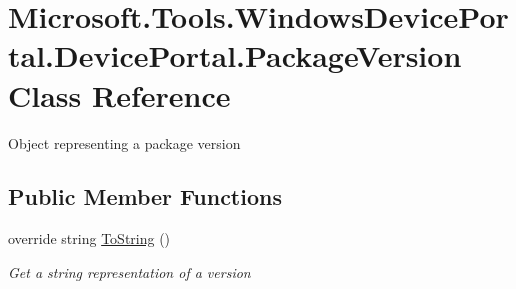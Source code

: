 \hypertarget{class_microsoft_1_1_tools_1_1_windows_device_portal_1_1_device_portal_1_1_package_version}{}\section{Microsoft.\+Tools.\+Windows\+Device\+Portal.\+Device\+Portal.\+Package\+Version Class Reference}
\label{class_microsoft_1_1_tools_1_1_windows_device_portal_1_1_device_portal_1_1_package_version}


Object representing a package version  


\subsection*{Public Member Functions}
\begin{DoxyCompactItemize}
\item 
override string \hyperlink{class_microsoft_1_1_tools_1_1_windows_device_portal_1_1_device_portal_1_1_package_version_af7bb78ae97bc2083ede3b669a39b6aa1}{To\+String} ()
\begin{DoxyCompactList}\small\item\em Get a string representation of a version \end{DoxyCompactList}\end{DoxyCompactItemize}
